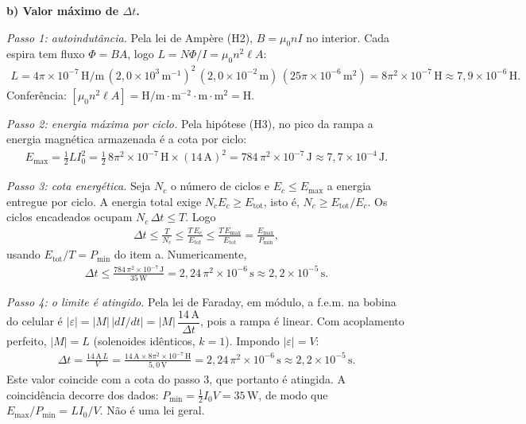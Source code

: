 \documentclass{article}%
\begin{document}
\textbf{b) Valor máximo de $\Delta t$.}

\textit{Passo 1: autoindutância.} Pela lei de Ampère (H2), $B = \mu_0 n I$ no interior. Cada espira tem fluxo $\Phi = BA$, logo $L = N\Phi/I = \mu_0 n^2 \ell A$:
\begin{align*}
L = 4\pi\times10^{-7}\,\text{H/m}\,(2{,}0\times10^{3}\,\text{m}^{-1})^2\,(2{,}0\times10^{-2}\,\text{m})\,(25\pi\times10^{-6}\,\text{m}^2) = 8\pi^2\times10^{-7}\,\text{H} \approx 7{,}9\times10^{-6}\,\text{H}.
\end{align*}
Conferência: $[\mu_0 n^2\ell A] = \text{H/m}\cdot\text{m}^{-2}\cdot\text{m}\cdot\text{m}^2 = \text{H}$.

\textit{Passo 2: energia máxima por ciclo.} Pela hipótese (H3), no pico da rampa a energia magnética armazenada é a cota por ciclo:
\begin{align*}
E_{\max} = \tfrac12 L I_0^2 = \tfrac12\,8\pi^2\times10^{-7}\,\text{H}\times(14\,\text{A})^2 = 784\,\pi^2\times10^{-7}\,\text{J} \approx 7{,}7\times10^{-4}\,\text{J}.
\end{align*}

\textit{Passo 3: cota energética.} Seja $N_c$ o número de ciclos e $E_c \le E_{\max}$ a energia entregue por ciclo. A energia total exige $N_c E_c \ge E_{\text{tot}}$, isto é, $N_c \ge E_{\text{tot}}/E_c$. Os ciclos encadeados ocupam $N_c\,\Delta t \le T$. Logo
\begin{align*}
\Delta t \le \frac{T}{N_c} \le \frac{T\,E_c}{E_{\text{tot}}} \le \frac{T\,E_{\max}}{E_{\text{tot}}} = \frac{E_{\max}}{P_{\min}},
\end{align*}
usando $E_{\text{tot}}/T = P_{\min}$ do item a. Numericamente,
\begin{align*}
\Delta t \le \frac{784\,\pi^2\times10^{-7}\,\text{J}}{35\,\text{W}} = 2{,}24\,\pi^2\times10^{-6}\,\text{s} \approx 2{,}2\times10^{-5}\,\text{s}.
\end{align*}

\textit{Passo 4: o limite é atingido.} Pela lei de Faraday, em módulo, a f.e.m. na bobina do celular é $|\varepsilon| = |M|\,|dI/dt| = |M|\,\dfrac{14\,\text{A}}{\Delta t}$, pois a rampa é linear. Com acoplamento perfeito, $|M| = L$ (solenoides idênticos, $k = 1$). Impondo $|\varepsilon| = V$:
\begin{align*}
\Delta t = \frac{14\,\text{A}\,L}{V} = \frac{14\,\text{A}\times8\pi^2\times10^{-7}\,\text{H}}{5{,}0\,\text{V}} = 2{,}24\,\pi^2\times10^{-6}\,\text{s} \approx 2{,}2\times10^{-5}\,\text{s}.
\end{align*}
Este valor coincide com a cota do passo 3, que portanto é atingida. A coincidência decorre dos dados: $P_{\min} = \tfrac12 I_0 V = 35\,\text{W}$, de modo que $E_{\max}/P_{\min} = LI_0/V$. Não é uma lei geral.
\end{document}

